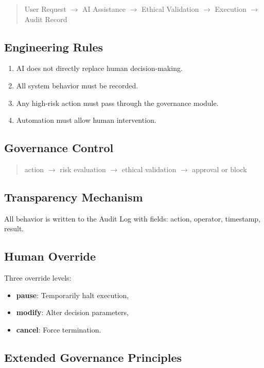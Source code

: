 \documentclass[conference]{IEEEtran}
\begin{document}
\begin{quote}
User Request $\to$ AI Assistance $\to$ Ethical Validation
$\to$ Execution $\to$ Audit Record
\end{quote}

\subsection{Engineering Rules}

\begin{enumerate}[nosep]
  \item AI does not directly replace human decision-making.
  \item All system behavior must be recorded.
  \item Any high-risk action must pass through the governance module.
  \item Automation must allow human intervention.
\end{enumerate}

\subsection{Governance Control}

\begin{quote}
action $\to$ risk evaluation $\to$ ethical validation
$\to$ approval or block
\end{quote}

\subsection{Transparency Mechanism}

All behavior is written to the Audit Log with fields:
action, operator, timestamp, result.

\subsection{Human Override}

Three override levels:
\begin{itemize}[nosep]
  \item \textbf{pause}: Temporarily halt execution,
  \item \textbf{modify}: Alter decision parameters,
  \item \textbf{cancel}: Force termination.
\end{itemize}

\subsection{Extended Governance Principles}
\end{document}
